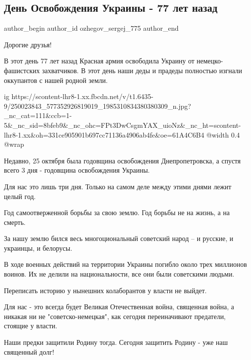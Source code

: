  
 
 
 
 
 
\subsection{День Освобождения Украины - 77 лет назад}
\label{sec:28_10_2021.fb.ozhegov_sergej_775.1.den_osvobozhdenia_77_let}
 
\ifcmt
 author_begin
   author_id ozhegov_sergej_775
 author_end
\fi

Дорогие друзья!

В этот день 77 лет назад Красная армия освободила Украину от немецко-фашистских
захватчиков. В этот день наши деды и прадеды полностью изгнали оккупантов с
нашей родной земли.

\ifcmt
  ig https://scontent-lhr8-1.xx.fbcdn.net/v/t1.6435-9/250023843_577352926819019_1985310834380380309_n.jpg?_nc_cat=111&ccb=1-5&_nc_sid=8bfeb9&_nc_ohc=FPt3DwCsgmYAX_uioNz&_nc_ht=scontent-lhr8-1.xx&oh=331ce905901b697cc71136a4906ab4fe&oe=61A4C6B4
  @width 0.4
  @wrap 
\fi

Недавно, 25 октября была годовщина освобождения Днепропетровска, а спустя всего
3 дня - годовщина освобождения Украины. 

Для нас это лишь три дня. Только на самом деле между этими днями лежит целый
год. 

Год самоотверженной борьбы за свою землю. Год борьбы не на жизнь, а на смерть.

За нашу землю бился весь многоциональный советский народ – и русские, и
украинцы, и белорусы. 

В ходе военных действий на территории Украины погибло около трех миллионов
воинов. Их не делили на национальности, все они были советскими людьми. 

Переписать историю у нынешних колаборантов у власти не выйдет. 

Для нас - это всегда будет Великая Отечественная война, священная война, а
никакая ни не "советско-немецкая", как сегодня переиначивают предатели, стоящие
у власти. 

Наши предки защитили Родину тогда. Сегодня защитить Родину - уже наш священный
долг!

